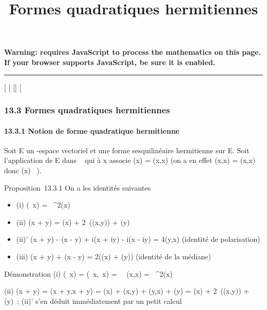 \documentclass[]{article}
\title{Formes quadratiques hermitiennes}
\author{}
\date{}
\begin{document}
\maketitle

\textbf{Warning: 
requires JavaScript to process the mathematics on this page.\\ If your
browser supports JavaScript, be sure it is enabled.}

\begin{center}\rule{3in}{0.4pt}\end{center}

{[}
{[}
{[}{]}
{[}

\subsubsection{13.3 Formes quadratiques hermitiennes}

\paragraph{13.3.1 Notion de forme quadratique hermitienne}

Soit E un -espace vectoriel et \phi une forme sesquilinéaire hermitienne
sur E. Soit \Phi l'application de E dans ~ qui à x associe \Phi(x) = \phi(x,x)
(on a en effet \phi(x,x) = \overline\phi(x,x) donc \Phi(x) \in
{}~).

Proposition~13.3.1 On a les identités suivantes

\begin{itemize}
\itemsep1pt\parskip0pt
\item
  (i) \Phi(\lambda~x) = \lambda~^2\Phi(x)
\item
  (ii) \Phi(x + y) = \Phi(x) +
  2\mathrmRe~(\phi(x,y)) + \Phi(y)
\item
  (ii)' \Phi(x + y) - \Phi(x - y) + i\Phi(x + iy) - i\Phi(x - iy) = 4\phi(y,x)
  (identité de polarisation)
\item
  (iii) \Phi(x + y) + \Phi(x - y) = 2(\Phi(x) + \Phi(y)) (identité de la médiane)
\end{itemize}

Démonstration (i) \Phi(\lambda~x) = \phi(\lambda~x,\lambda~x) =
\lambda~\overline\lambda~\phi(x,x) =
\lambda~^2\Phi(x)

(ii) \Phi(x + y) = \phi(x + y,x + y) = \Phi(x) + \phi(x,y) + \phi(y,x) + \Phi(y) = \Phi(x) +
2\mathrmRe~(\phi(x,y)) + \Phi(y)~;
(ii)' s'en déduit immédiatement par un petit calcul
\end{document}
